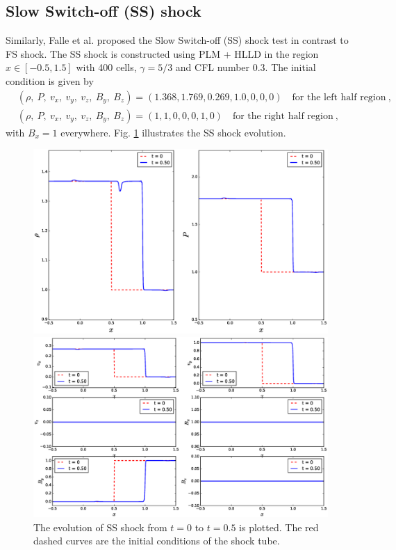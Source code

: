 \documentclass[10.5pt]{article}
\begin{document}
\subsection{Slow Switch-off (SS) shock}
Similarly, Falle et al. proposed the Slow Switch-off (SS) shock test in contrast to FS shock.
The SS shock is constructed using PLM + HLLD in the region $x\in[-0.5,1.5]$ with 400 cells, $\gamma=5/3$ and 
CFL number 0.3.
The initial condition is given by 
\begin{align}
	&(\rho,\ P,\ v_x,\ v_y,\ v_z,\ B_y,\ B_z) = (1.368,1.769,0.269,1.0,0,0,0) \quad
	\text{for the left half region}  \ , \\
	&(\rho,\ P,\ v_x,\ v_y,\ v_z,\ B_y,\ B_z) = (1,1,0,0,0,1,0) \quad
	\text{for the right half region}  \ , 
\end{align}
with $B_x = 1$ everywhere. 
Fig. \ref{fig: SS test} illustrates the SS shock evolution.
\begin{figure}[ht]
	\centering
	\begin{minipage}[c]{0.9\textwidth}
		\includegraphics[width=1\textwidth]{SS1.eps}
	\end{minipage}
	\begin{minipage}[c]{0.9\textwidth}
		\includegraphics[width=1\textwidth]{SS2.eps}
	\end{minipage}%
\caption{The evolution of SS shock from $t=0$ to $t=0.5$ is plotted. 
The red dashed curves are the initial conditions of the shock tube.}
\label{fig: SS test}
\end{figure}
\end{document}
